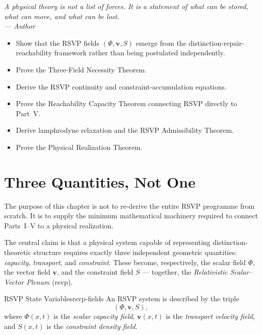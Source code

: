 \documentclass[12pt,twoside,openright]{book}
\newenvironment{epigraph}[2]{%
  \vspace{1em}\begin{flushright}
  \begin{minipage}{0.72\textwidth}
  \itshape\small #1\\[0.4em]
  \upshape\footnotesize\sffamily\color{DistGray}--- #2
  \end{minipage}\end{flushright}\vspace{1.5em}}{}
\newenvironment{objectives}{%
  \begin{tcolorbox}[colback=DistBlue!5,colframe=DistBlue,
    title={\faCheckCircle\enspace Learning Objectives},
    fonttitle=\sffamily\bfseries\color{white},
    attach boxed title to top left={yshift=-2mm,xshift=4mm},
    boxed title style={colback=DistBlue},breakable]
  \begin{itemize}[leftmargin=*,nosep]}{%
  \end{itemize}\end{tcolorbox}\vspace{1em}}
\begin{document}
\begin{epigraph}{%
  A physical theory is not a list of forces. It is a
  statement of what can be stored, what can move, and
  what can be lost.}%
  {Author}
\end{epigraph}

\begin{objectives}
  \item Show that the RSVP fields $(\Phi,\mathbf{v},S)$ emerge
        from the distinction-repair-reachability framework
        rather than being postulated independently.
  \item Prove the Three-Field Necessity Theorem.
  \item Derive the RSVP continuity and constraint-accumulation
        equations.
  \item Prove the Reachability Capacity Theorem connecting
        RSVP directly to Part~V.
  \item Derive lamphrodyne relaxation and the RSVP
        Admissibility Theorem.
  \item Prove the Physical Realization Theorem.
\end{objectives}

\section{Three Quantities, Not One}
\label{sec:ch16-three}

The purpose of this chapter is not to re-derive the entire
RSVP programme from scratch. It is to supply the minimum
mathematical machinery required to connect
Parts~I--V to a physical realization.

The central claim is that a physical system capable of
representing distinction-theoretic structure requires
exactly three independent geometric quantities:
\emph{capacity}, \emph{transport}, and \emph{constraint}.
These become, respectively, the scalar field $\Phi$, the
vector field $\mathbf{v}$, and the constraint field $S$ —
together, the \emph{Relativistic Scalar--Vector Plenum}
(\gls{rsvp}).

\begin{definition}{RSVP State Variables}{rsvp-fields}
  An RSVP system is described by the triple
  \[
    (\Phi, \mathbf{v}, S),
  \]
  where $\Phi(x,t)$ is the \emph{scalar capacity field},
  $\mathbf{v}(x,t)$ is the \emph{transport velocity field},
  and $S(x,t)$ is the \emph{constraint density field}.
\end{definition}
\end{document}
